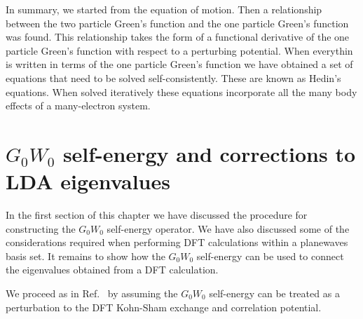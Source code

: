 In summary, we started from the equation of motion. Then a relationship between
the two particle Green's function and the one particle Green's function was found.
This relationship takes the form of a functional derivative of the one particle Green's function with
respect to a perturbing potential. When everythin is written in terms 
of the one particle Green's function we have obtained a set of equations 
that need to be solved self-consistently. 
These are known as Hedin's equations. When solved iteratively these 
equations incorporate all the many body effects of a many-electron system.

\section{$G_0W_0$ self-energy and corrections to LDA eigenvalues}
\noindent
In the first section of this chapter we have discussed the
procedure for constructing the $G_0W_0$ self-energy operator.
We have also discussed some of the considerations required when
performing DFT calculations within a planewaves basis set.
It remains to show how the $G_0W_0$ self-energy can be
used to connect the eigenvalues obtained from a DFT calculation.

We proceed as in Ref.~\cite{HL86} by assuming the $G_0W_0$
self-energy can be treated as a perturbation to the
DFT Kohn-Sham exchange and correlation potential.

